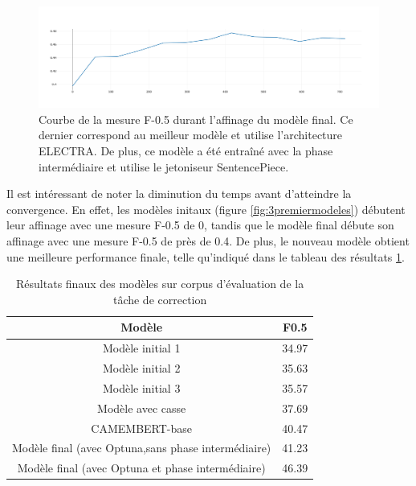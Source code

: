 \documentclass[12pt,twoside,maitrise]{dms}
\theoremstyle{definition}
\numberwithin{equation}{section}
\numberwithin{table}{chapter}
\numberwithin{figure}{chapter}
\begin{document}
\begin{figure}
	\begin{center}
		\includegraphics[width=1.0\textwidth]{figures/meilleurmodelenatf05.png}
	\end{center}
	\caption{Courbe de la mesure F-0.5 durant l'affinage du modèle final. Ce dernier correspond au meilleur modèle et utilise l'architecture ELECTRA. De plus, ce modèle a été entraîné avec la phase intermédiaire et utilise le jetoniseur SentencePiece.}\label{fig:meilleurmodeleaweb}
\end{figure}
Il est intéressant de noter la diminution du temps avant d'atteindre la
convergence. En effet, les modèles initaux (figure \ref{fig:3premiermodeles})
débutent leur affinage avec une mesure F-0.5 de 0, tandis que le modèle final
débute son affinage avec une mesure F-0.5 de près de 0.4. De plus, le nouveau
modèle obtient une meilleure performance finale, telle qu'indiqué dans le tableau des
résultats \ref{table:resultatfinaux}.
\begin{table}
	\centering
	\begin{tabular}{||c | c||}
		\hline
		Modèle                                              & F0.5  \\ [0.5ex]
		\hline\hline
		Modèle initial 1                                    & 34.97 \\
		Modèle initial 2                                    & 35.63 \\
		Modèle initial 3                                    & 35.57 \\
		Modèle avec casse                                   & 37.69 \\
		CAMEMBERT-base                                      & 40.47 \\
		Modèle final (avec Optuna,sans phase intermédiaire) & 41.23 \\
		Modèle final  (avec Optuna et phase intermédiaire)  & 46.39 \\
		\hline
	\end{tabular}
	\caption{Résultats finaux des modèles sur corpus d'évaluation de la tâche de correction}
	\label{table:resultatfinaux}
\end{table}
\end{document}
